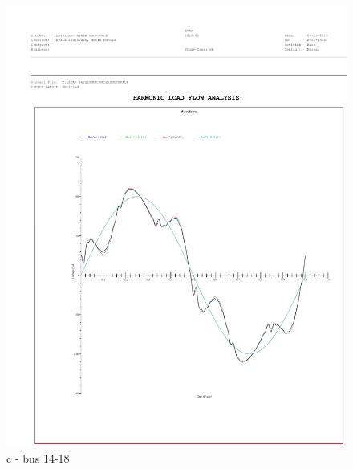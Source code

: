 \begin{figure}
\begin{minipage}[b]{0.4\linewidth}
		\includegraphics[width=\textwidth]{figures/fig_ch04_elecaudit_bus_harmonic_waveform1418}
		\caption*{c - bus 14-18}
	\end{minipage}
	\hspace{0.05cm}
\begin{minipage}[b]{0.4\linewidth}
	\centering

\end{minipage}
\end{figure}
